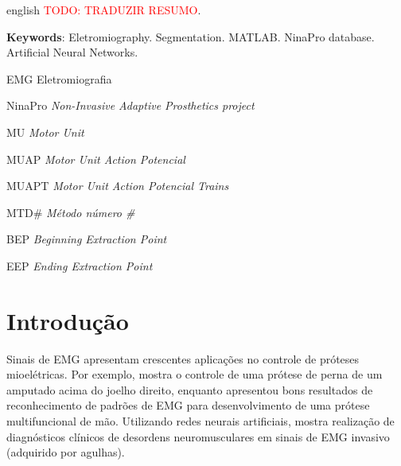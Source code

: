\begin{resumo}[Abstract]
 \begin{otherlanguage*}{english}
	\textcolor{red}{TODO: TRADUZIR RESUMO}.
	
   \vspace{\onelineskip}
   \noindent 
   \textbf{Keywords}: Eletromiography. Segmentation. MATLAB. NinaPro database. Artificial Neural Networks.
 \end{otherlanguage*}
\end{resumo}


\listoffigures*
\cleardoublepage

\listoftables*
\cleardoublepage

\begin{siglas}
  	\item[EMG]		Eletromiografia
	\item[NinaPro]	\emph{Non-Invasive Adaptive Prosthetics project}
	\item[MU]		\emph{Motor Unit}
  	\item[MUAP]		\emph{Motor Unit Action Potencial}
	\item[MUAPT]	\emph{Motor Unit Action Potencial Trains}
	\item[MTD\#]	\emph{Método número \#}
	\item[BEP]		\emph{Beginning Extraction Point}
	\item[EEP]		\emph{Ending Extraction Point}
\end{siglas}

\tableofcontents*
\cleardoublepage

\textual
	\chapter{Introdução}
Sinais de EMG apresentam crescentes aplicações no controle de próteses mioelétricas. Por exemplo, \cite{Hargrove2013} mostra o controle de uma prótese de perna de um amputado acima do joelho direito, enquanto \cite{Jun-UkChu2007} apresentou bons resultados de reconhecimento de padrões de EMG para desenvolvimento de uma prótese multifuncional de mão. Utilizando redes neurais artificiais, \cite{Pattichis1995} mostra realização de diagnósticos clínicos de desordens neuromusculares em sinais de EMG invasivo (adquirido por agulhas).

